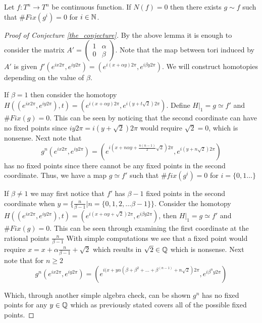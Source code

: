 \documentclass[11pt,oneside,draft]{amsart}
\numberwithin{equation}{section} %
\numberwithin{figure}{section} %
\begin{document}
\begin{conj}\label{the_conjecture} Let $f\colon T^n \longrightarrow T^n$ be continuous function. If $N(f)=0$ then there exists $g\sim f$ such that $\# Fix(g^i)=0$ for $i\in \mathbb{N}$.
\end{conj}
\begin{proof}[Proof of Conjecture \ref{the_conjecture}]


By the above lemma it is enough to consider the matrix $A'=\left( \begin{array}{ccc}
	1 & \alpha  \\
	0 & \beta \end{array} \right)$. Note that the map between tori induced by $A'$ is given $f'(e^{ix2\pi},e^{iy2\pi})=(e^{i(x+\alpha y)2\pi},e^{i\beta y2\pi})$. We will construct homotopies depending on the value of $\beta$.

    	If $\beta=1$ then consider the homotopy $H((e^{ix2\pi},e^{iy2\pi}),t)=(e^{i(x+\alpha y)2\pi},e^{i(y+t\sqrt{2})2\pi})$. Define $H|_{1}=g \simeq f'$  and $\#Fix(g)={0}$. 
        This can be seen by noticing that the second coordinate can have no fixed points 
        since $iy2\pi =i(y + \sqrt{2})2\pi$ would require $\sqrt{2}=0$, which is nonsense. 
        Next note that $$g^n(e^{ix2\pi},e^{iy2\pi})=(e^{i(x+n\alpha y +\frac{n(n-1)}{2}\sqrt{2})2\pi},e^{i(y+n\sqrt{2})2\pi})$$
        has no fixed points since there cannot be any fixed points in the second 
        coordinate. Thus, we have a map $g\simeq f'$ such that $\#fix(g^i)=0$ for $i=\{0,1 \ldots \}$
        

    	If $\beta \not =1$ we may first notice that $f'$ has $\beta-1$ fixed points in the 
        second coordinate when $y=\{\frac{n}{\beta-1}| n=\{0,1,2, \ldots \beta-1\}\}$. 
        Consider the homotopy $H((e^{ix2\pi},e^{iy2\pi}),t)=(e^{i(x+\alpha y + \sqrt{2})2\pi},e^{i\beta y2\pi})$, then $H|_{1}=g \simeq f'$ and $\#Fix(g)={0}$. This can be seen 
        through examining the first coordinate at the rational points $\frac{n}{\beta -1}$ 
        With simple computations we see that a fixed point would require $x=x+\alpha \frac{n}{\beta -1} +\sqrt{2} $ which results in $ \sqrt{2}\in \mathbb{Q}$ which is nonsense. Next 
        note that for $n\geq 2$
        $$g^n(e^{ix2\pi},e^{iy2\pi})=(e^{i(x +y\alpha(\beta + \beta^2 + \ldots +\beta^{(n-1)}+n\sqrt{2})2\pi},e^{i\beta^ny2\pi})$$
        
       Which, through another simple algebra check, can be shown $g^n$ has no fixed points 
       for any $y\in \mathbb{Q}$ which as previously stated covers all of the possible fixed points. 
\end{proof}
\end{document}
